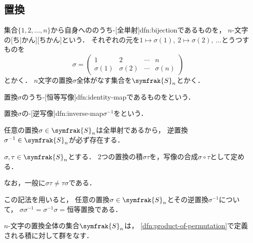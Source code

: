\documentclass[../sotsu.tex]{subfiles}
\begin{document}
\subsection{置換}

\begin{definition}
    \label{dfn:permutation}
    集合$\{ 1, 2, \dots, n \}$から自身へののうち-[全単射]{dfn:bijection}であるものを，
    $n$-文字の[ち|かん][ちかん]という．
    それぞれの元を$1 \mapsto \sigma(1), \  2 \mapsto \sigma(2), \  \dotsc$とうつすものを
    \begin{equation*}
        \sigma = 
        \begin{pmatrix}
                   1  &        2  & \cdots &        n  \\
            \sigma(1) & \sigma(2) & \cdots & \sigma(n)
        \end{pmatrix}
    \end{equation*}
    とかく．
    $n$文字の置換$\sigma$全体がなす集合を$\symfrak{S}_n$とかく．
\end{definition}

\begin{definition}
    \label{dfn:identity-permutation}
    置換$\sigma$のうち-[恒等写像]{dfn:identity-map}であるものをという．   
\end{definition}

\begin{definition}
    \label{dfn:inverse-of-permutation}
    置換$\sigma$の-[逆写像]{dfn:inverse-map}$\sigma^{-1}$をという．
\end{definition}

任意の置換$\sigma \in \symfrak{S}_n$は全単射であるから，
逆置換$\sigma^{-1} \in \symfrak{S}_n$が必ず存在する．

\begin{definition}[置換の積]
    \label{dfn:product-of-permutation}
    $\sigma, \tau \in \symfrak{S}_n$とする．
    2つの置換の積$\sigma\tau$を，写像の合成$\sigma \circ \tau$として定める．
\end{definition}

なお，一般に$\sigma \tau \neq \tau \sigma$である．

この記法を用いると，
任意の置換$\sigma \in \symfrak{S}_n$とその逆置換$\sigma^{-1}$について，
$\sigma \sigma^{-1} = \sigma^{-1} \sigma = \text{恒等置換}$である．

\begin{proposition}
    $n$-文字の置換全体の集合$\symfrak{S}_n$は，
    \cref{dfn:product-of-permutation}で定義される積に対して群をなす．
\end{proposition}
\end{document}
